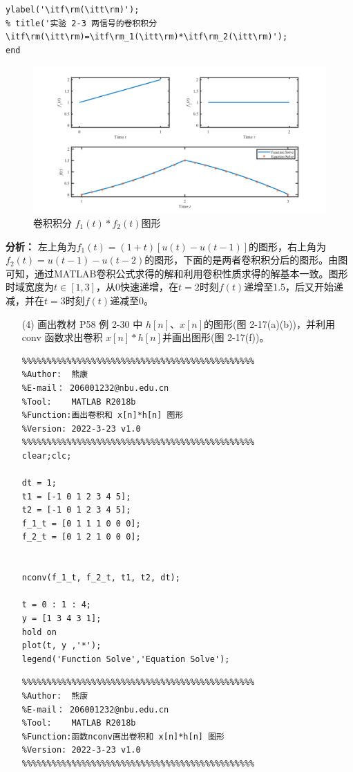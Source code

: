 \documentclass[UTF8,AutoFakeBold]{ctexart}
\begin{document}
\begin{enumerate}
\begin{enumerate}
\begin{lstlisting}
ylabel('\itf\rm(\itt\rm)');
% title('实验 2-3 两信号的卷积积分 \itf\rm(\itt\rm)=\itf\rm_1(\itt\rm)*\itf\rm_2(\itt\rm)');
end
				\end{lstlisting}
				\begin{figure}[H]
					\centering
					\includegraphics[scale=0.5]{./figures/photo6.png}
					\caption{卷积积分 $f_1(t)* f_2(t)$图形}
				\end{figure}

				\textbf{\songti 分析：} 左上角为$f_1(t)=(1+t)[u(t)-u(t-1)]$的图形，右上角为$f_2(t)=u(t-1)-u(t-2)$的图形，下面的是两者卷积积分后的图形。由图可知，通过MATLAB卷积公式求得的解和利用卷积性质求得的解基本一致。图形时域宽度为$t\in [1,3]$，从0快速递增，在$t=2$时刻$f(t)$递增至1.5，后又开始递减，并在$t=3$时刻$f(t)$递减至0。
		\end{enumerate}


		\begin{enumerate}
			\item[(4)] 画出教材 P58 例 2-30 中 $h[n]$、$x[n]$的图形(图 2-17(a)(b))，并利用 conv 函数求出卷积 $x[n]*h[n]$并画出图形(图 2-17(f))。	
			\begin{lstlisting}
%%%%%%%%%%%%%%%%%%%%%%%%%%%%%%%%%%%%%%%%%%%%%%% 
%Author:  熊康
%E-mail： 206001232@nbu.edu.cn
%Tool:    MATLAB R2018b
%Function:画出卷积和 x[n]*h[n] 图形
%Version: 2022-3-23 v1.0
%%%%%%%%%%%%%%%%%%%%%%%%%%%%%%%%%%%%%%%%%%%%%%%
clear;clc;

dt = 1;
t1 = [-1 0 1 2 3 4 5];
t2 = [-1 0 1 2 3 4 5];
f_1_t = [0 1 1 1 0 0 0];
f_2_t = [0 1 2 1 0 0 0];


nconv(f_1_t, f_2_t, t1, t2, dt);

t = 0 : 1 : 4;
y = [1 3 4 3 1];
hold on
plot(t, y ,'*');
legend('Function Solve','Equation Solve');
				\end{lstlisting}

				\begin{lstlisting}
%%%%%%%%%%%%%%%%%%%%%%%%%%%%%%%%%%%%%%%%%%%%%%% 
%Author:  熊康
%E-mail： 206001232@nbu.edu.cn
%Tool:    MATLAB R2018b
%Function:函数nconv画出卷积和 x[n]*h[n] 图形
%Version: 2022-3-23 v1.0
%%%%%%%%%%%%%%%%%%%%%%%%%%%%%%%%%%%%%%%%%%%%%%%


\end{lstlisting}
\end{enumerate}
\end{enumerate}
\end{document}
